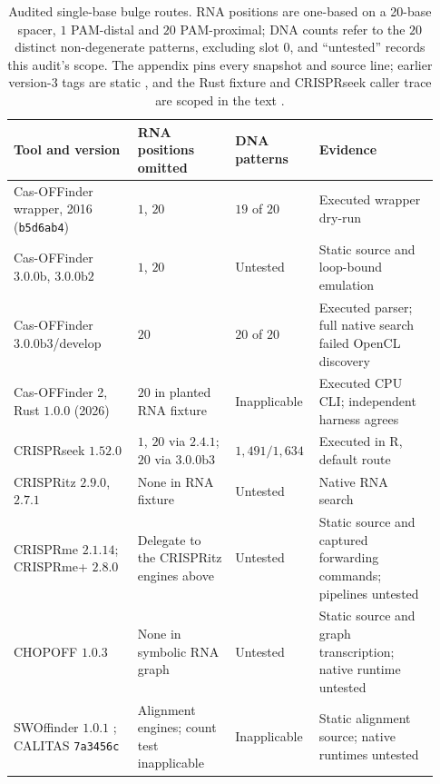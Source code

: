 \begin{table}[!tbp]
\centering
\caption{Audited single-base bulge routes. RNA positions are one-based on a 20-base
spacer, $1$ PAM-distal and $20$ PAM-proximal; DNA counts refer to the $20$ distinct
non-degenerate patterns, excluding slot $0$, and ``untested'' records this audit's scope.
The appendix pins every snapshot and source line; earlier version-3 tags are static
\citep{casoffinder_v3_tags_2026}, and the Rust fixture and CRISPRseek caller trace are
scoped in the text \citep{casoffinder2_rust_2026,crisprseek_1531_source,fieldlevel_audit_2026}.}
\label{tab:tool-audit}
\small
\setlength{\tabcolsep}{4pt}
\renewcommand{\arraystretch}{1.12}
\begin{tabular}{@{}p{0.29\linewidth}p{0.22\linewidth}p{0.15\linewidth}p{0.27\linewidth}@{}}
\toprule
\raggedright Tool and version &\raggedright RNA positions omitted &\raggedright DNA patterns &\raggedright Evidence \tabularnewline
\midrule
\raggedright Cas-OFFinder wrapper, 2016 (\texttt{b5d6ab4}) &\raggedright $1$, $20$ &\raggedright $19$ of $20$ &\raggedright Executed wrapper dry-run \tabularnewline
\raggedright Cas-OFFinder $3.0.0\mathrm{b}$, $3.0.0\mathrm{b}2$ &\raggedright $1$, $20$ &\raggedright Untested &\raggedright Static source and loop-bound emulation \tabularnewline
\raggedright Cas-OFFinder $3.0.0\mathrm{b}3$/develop &\raggedright $20$ &\raggedright $20$ of $20$ &\raggedright Executed parser; full native search failed OpenCL discovery \tabularnewline
\raggedright Cas-OFFinder 2, Rust $1.0.0$ (2026) &\raggedright $20$ in planted RNA fixture &\raggedright Inapplicable &\raggedright Executed CPU CLI; independent harness agrees \tabularnewline
\raggedright CRISPRseek $1.52.0$ &\raggedright $1$, $20$ via $2.4.1$; $20$ via $3.0.0\mathrm{b}3$ &\raggedright $1{,}491/1{,}634$ &\raggedright Executed in R, default route \tabularnewline
\raggedright CRISPRitz $2.9.0$, $2.7.1$ &\raggedright None in RNA fixture &\raggedright Untested &\raggedright Native RNA search \tabularnewline
\raggedright CRISPRme $2.1.14$; CRISPRme+ $2.8.0$ &\raggedright Delegate to the CRISPRitz engines above &\raggedright Untested &\raggedright Static source and captured forwarding commands; pipelines untested \tabularnewline
\raggedright CHOPOFF $1.0.3$ &\raggedright None in symbolic RNA graph &\raggedright Untested &\raggedright Static source and graph transcription; native runtime untested \tabularnewline
\raggedright SWOffinder $1.0.1$ \citep{yaish2023swoffinder}; CALITAS \texttt{7a3456c} &\raggedright Alignment engines; count test inapplicable &\raggedright Inapplicable &\raggedright Static alignment source; native runtimes untested \tabularnewline
\bottomrule
\end{tabular}
\end{table}

